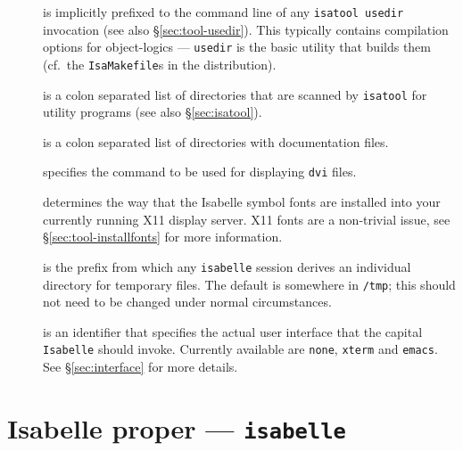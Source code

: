 \begin{description}
\item[] is implicitly prefixed to the
  command line of any \texttt{isatool usedir} invocation (see also
  \S\ref{sec:tool-usedir}). This typically contains compilation
  options for object-logics --- \texttt{usedir} is the basic utility
  that builds them (cf.\ the \texttt{IsaMakefile}s in the
  distribution).

\item[] is a colon separated list of
  directories that are scanned by \texttt{isatool} for utility
  programs (see also \S\ref{sec:isatool}).

\item[] is a colon separated list of directories
  with documentation files.
  
\item[] specifies the command to be used for
  displaying \texttt{dvi} files.

\item[] determines the way that the
  Isabelle symbol fonts are installed into your currently running X11
  display server. X11 fonts are a non-trivial issue, see
  \S\ref{sec:tool-installfonts} for more information.
  
\item[] is the prefix from which any
  \texttt{isabelle} session derives an individual directory for
  temporary files.  The default is somewhere in \texttt{/tmp}; this
  should not need to be changed under normal circumstances.
  
\item[] is an identifier that specifies the
  actual user interface that the capital \texttt{Isabelle} should
  invoke.  Currently available are \texttt{none}, \texttt{xterm} and
  \texttt{emacs}. See \S\ref{sec:interface} for more details.

\end{description}


\section{Isabelle proper --- \texttt{isabelle}}

